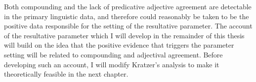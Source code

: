 \documentclass[MilwayThesis]{subfiles}
\begin{document}
Both compounding and the lack of predicative adjective agreement are detectable in the primary linguistic data, and therefore could reasonably be taken to be the positive data responsible for the setting of the resultative parameter.
The account of the resultative parameter which I will develop in the remainder of this thesis will build on the idea that the positive evidence that triggers the parameter setting will be related to compounding and adjectival agreement.
Before developing such an account, I will modify Kratzer's analysis to make it theoretically feasible in the next chapter.
\end{document}

